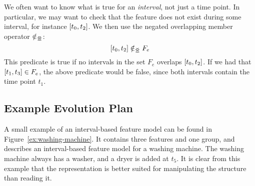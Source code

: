 We often want to know what is true for an \emph{interval}, not just a time point. In particular, we may want to check that the feature does not exist during some interval, for instance $\interval{t_0}{t_2}$. We then use the negated overlapping member operator $\notin_{\leq\!\!\!\!\geq{}}$:
\[
  \interval{t_0}{t_2} \notinnr F_e
\]
This predicate is true if no intervals in the set $F_e$ overlaps $\interval{t_0}{t_2}$. If we had that $\interval{t_1}{t_3} \in F_e$, the above predicate would be false, since both intervals contain the time point $t_1$.

\subsection{Example Evolution Plan}
A small example of an interval-based feature model can be found in Figure~\vref{ex:washing-machine}. It contains three features and one group, and describes an interval-based feature model for a washing machine. The washing machine always has a washer, and a dryer is added at $t_5$. It is clear from this example that the representation is better suited for manipulating the structure than reading it. 

